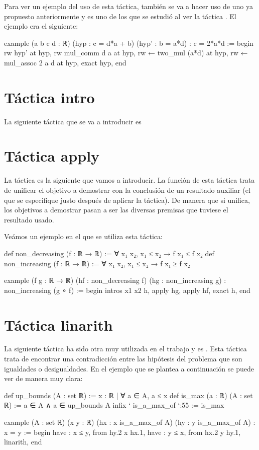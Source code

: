Para ver un ejemplo del uso de esta táctica, también se va a hacer uso de uno
ya propuesto anteriormente y es uno de los que se estudió al ver la táctica
. El ejemplo era el siguiente:

\begin{leancode}
example (a b c d : ℝ) (hyp : c = d*a + b) (hyp' : b = a*d) : c = 2*a*d :=
begin
  rw hyp' at hyp,
  rw mul_comm d a at hyp,
  rw ← two_mul (a*d) at hyp,
  rw ← mul_assoc 2 a d at hyp,
  exact hyp,
end
\end{leancode}


\section{Táctica intro}
La siguiente táctica que se va a introducir es 

\section{Táctica apply}
La táctica  es la siguiente que vamos a introducir. La
función de esta táctica trata de unificar el objetivo a demostrar con la
conclusión de un resultado auxiliar (el que se especifique justo después de
aplicar la táctica). De manera que si unifica, los objetivos a demostrar pasan
a ser las diversas premisas que tuviese el resultado usado.

Veámos un ejemplo en el que se utiliza esta táctica:
\begin{leancode}
def non_decreasing (f : ℝ → ℝ) := ∀ x₁ x₂, x₁ ≤ x₂ → f x₁ ≤ f x₂
def non_increasing (f : ℝ → ℝ) := ∀ x₁ x₂, x₁ ≤ x₂ → f x₁ ≥ f x₂

example (f g : ℝ → ℝ) (hf : non_decreasing f) (hg : non_increasing g) : 
non_increasing (g ∘ f) :=
begin
  intros x1 x2 h,
  apply hg,
  apply hf,
  exact h,
end
\end{leancode}


\section{Táctica linarith}
La siguiente táctica ha sido otra muy utilizada en el trabajo y es
. Esta táctica trata de encontrar una contradicción
entre las hipótesis del problema que son igualdades o desigualdades. En el
ejemplo que se plantea a continuación se puede ver de manera muy clara:

\begin{leancode}
def up_bounds (A : set ℝ) := { x : ℝ | ∀ a ∈ A, a ≤ x}
def is_max (a : ℝ) (A : set ℝ) := a ∈ A ∧ a ∈ up_bounds A
infix ` is_a_max_of `:55 := is_max

example (A : set ℝ) (x y : ℝ) (hx : x is_a_max_of A) (hy : y is_a_max_of A) :
x = y :=
begin
  have : x ≤ y, from hy.2 x hx.1,
  have : y ≤ x, from hx.2 y hy.1,
  linarith,
end
\end{leancode}

